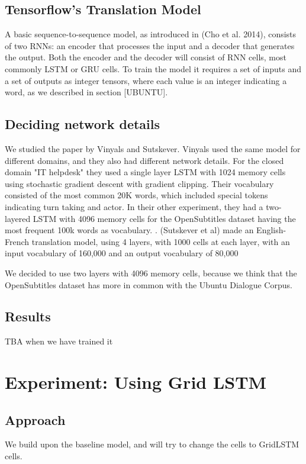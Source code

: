 \documentclass{article} %
\begin{document}
\subsection{Tensorflow's Translation Model}

A basic sequence-to-sequence model, as introduced in (Cho et al. 2014), consists of two RNNs: an encoder that processes the input and a decoder that generates the output. Both the encoder and the decoder will consist of RNN cells, most commonly LSTM or GRU cells. To train the model it requires a set of inputs and a set of outputs as integer tensors, where each value is an integer indicating a word, as we described in section [UBUNTU].


\subsection{Deciding network details}
We studied the paper by Vinyals and Sutskever. Vinyals used the same model for different domains, and they also had different network details. For the closed domain "IT helpdesk" they used a single layer LSTM with 1024 memory cells using stochastic gradient descent with gradient clipping. Their vocabulary consisted of the most common 20K words, which included special tokens indicating turn taking and actor. In their other experiment, they had a two-layered LSTM with 4096 memory cells for the OpenSubtitles dataset \cite{OpenSubtitles} having the most frequent 100k words as vocabulary. \cite{Vinyals}. (Sutskever et al) made an English-French translation model, using 4 layers, with 1000 cells at each layer, with an input vocabulary of 160,000 and an output vocabulary of 80,000 \cite{Sutskever}

We decided to use two layers with 4096 memory cells, because we think that the OpenSubtitles dataset has more in common with the Ubuntu Dialogue Corpus. 

\subsection{Results}
TBA when we have trained it

\section{Experiment: Using Grid LSTM}

\subsection{Approach}
We build upon the baseline model, and will try to change the cells to GridLSTM cells. 
\end{document}
